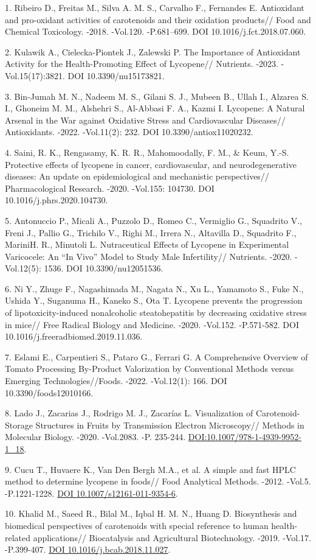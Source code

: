 \begin{refs}
1. Ribeiro D., Freitas M., Silva A. M. S., Carvalho F., Fernandes E.
Antioxidant and pro-oxidant activities of carotenoids and their
oxidation products// Food and Chemical Toxicology. -2018. -Vol.120.
-P.681--699. DOI 10.1016/j.fct.2018.07.060.

2. Kulawik A., Cielecka-Piontek J., Zalewski P. The Importance of
Antioxidant Activity for the Health-Promoting Effect of Lycopene//
Nutrients. -2023. -Vol.15(17):3821. DOI 10.3390/nu15173821.

3. Bin-Jumah M. N., Nadeem M. S., Gilani S. J., Mubeen B., Ullah I.,
Alzarea S. I., Ghoneim M. M., Alshehri S., Al-Abbasi F. A., Kazmi I.
Lycopene: A Natural Arsenal in the War against Oxidative Stress and
Cardiovascular Diseases// Antioxidants. -2022. -Vol.11(2): 232. DOI
10.3390/antiox11020232.

4. Saini, R. K., Rengasamy, K. R. R., Mahomoodally, F. M., \& Keum, Y.-S.
Protective effects of lycopene in cancer, cardiovascular, and
neurodegenerative diseases: An update on epidemiological and
mechanistic perspectives// Pharmacological Research. -2020. -Vol.155:
104730. DOI 10.1016/j.phrs.2020.104730.

5. Antonuccio P., Micali A., Puzzolo D., Romeo C., Vermiglio G.,
Squadrito V., Freni J., Pallio G., Trichilo V., Righi M., Irrera N.,
Altavilla D., Squadrito F., MariniH. R., Minutoli L. Nutraceutical
Effects of Lycopene in Experimental Varicocele: An ``In Vivo'' Model
to Study Male Infertility// Nutrients. -2020. -Vol.12(5): 1536. DOI
10.3390/nu12051536.

6. Ni Y., Zhuge F., Nagashimada M., Nagata N., Xu L., Yamamoto S., Fuke
N., Ushida Y., Suganuma H., Kaneko S., Ota T. Lycopene prevents the
progression of lipotoxicity-induced nonalcoholic steatohepatitis by
decreasing oxidative stress in mice// Free Radical Biology and
Medicine. -2020. -Vol.152. -P.571-582. DOI
10.1016/j.freeradbiomed.2019.11.036.

7. Eslami E., Carpentieri S., Pataro G., Ferrari G. A Comprehensive
Overview of Tomato Processing By-Product Valorization by Conventional
Methods versus Emerging Technologies//Foods. -2022. -Vol.12(1): 166.
DOI 10.3390/foods12010166.

8. Lado J., Zacarias J., Rodrigo M. J., Zacarías L. Visualization of
Carotenoid-Storage Structures in Fruits by Transmission Electron
Microscopy// Methods in Molecular Biology. -2020. -Vol.2083. -P.
235-244.
\href{https://doi.org/10.1007/978-1-4939-9952-1_18}{DOI:10.1007/978-1-4939-9952-1\_18}.

9. Cucu T., Huvaere K., Van Den Bergh M.A., et al. A simple and fast HPLC
method to determine lycopene in foods// Food Analytical Methods.
-2012. -Vol.5. -P.1221-1228.
\href{https://doi.org/10.1007/s12161-011-9354-6}{DOI
10.1007/s12161-011-9354-6}.

10. Khalid M., Saeed R., Bilal M., Iqbal H. M. N., Huang D. Biosynthesis
and biomedical perspectives of carotenoids with special reference to
human health-related applications// Biocatalysis and Agricultural
Biotechnology. -2019. -Vol.17. -P.399-407.
\href{https://doi.org/10.1016/j.bcab.2018.11.027}{DOI
10.1016/j.bcab.2018.11.027}.
\end{refs}

